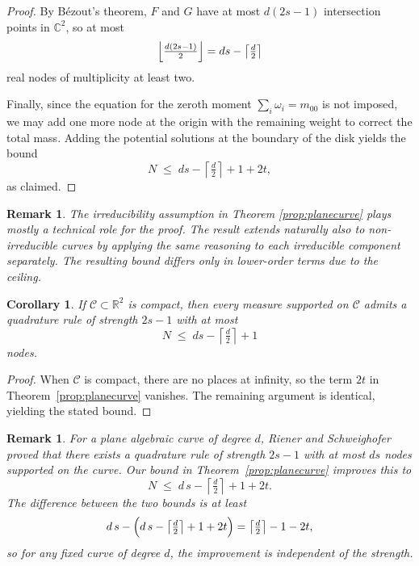 \documentclass[11pt,a4paper]{amsart}
\numberwithin{equation}{section}
\newtheorem{cor}[thm]{Corollary}
\newtheorem{remark}[thm]{Remark}
\theoremstyle{definition}
\newcommand{\R}{\mathbb{R}}
\newcommand{\C}{\mathbb{C}}
\numberwithin{thm}{section}
\theoremstyle{break}
\numberwithin{subcase}{case}
\begin{document}
\begin{proof}
By Bézout’s theorem, $F$ and $G$ have at most $d(2s-1)$ intersection points in $\C^2$, so at most  
\[
\Bigl\lfloor \tfrac{d(2s-1)}{2} \Bigr\rfloor = ds - \left\lceil \tfrac d2 \right\rceil
\]
real nodes of multiplicity at least two. 

Finally, since the equation for the zeroth moment $\sum_i \omega_i = m_{00}$ is not imposed, we may add one more node at the origin with the remaining weight to correct the total mass. Adding the potential solutions at the boundary of the disk yields the bound  
\[
N \;\le\; ds - \left\lceil \tfrac d2 \right\rceil + 1 + 2t,
\]
as claimed.
\end{proof}

\begin{remark}
    {The irreducibility assumption in Theorem \ref{prop:planecurve} plays mostly a technical role for the proof. The result extends naturally also to non-irreducible curves by applying the same reasoning to each irreducible component separately. The resulting bound differs only in lower-order terms due to the ceiling.}
\end{remark}



\begin{cor}
If $\mathcal C \subset \R^2$ is compact, then every measure supported on $\mathcal C$ admits a quadrature rule of strength $2s-1$ with at most  
\[
N \;\le\; ds - \left\lceil \tfrac d2 \right\rceil + 1
\]
nodes.
\end{cor}

\begin{proof}
When $\mathcal C$ is compact, there are no places at infinity, so the term $2t$ in Theorem~\ref{prop:planecurve} vanishes. The remaining argument is identical, yielding the stated bound.
\end{proof}


\begin{remark}
For a plane algebraic curve of degree $d$, Riener and Schweighofer~\cite{RS} proved that there exists a quadrature rule of strength $2s-1$ with at most $ds$ nodes supported on the curve. 
Our bound in Theorem~\ref{prop:planecurve} improves this to  
\[
N \;\le\; d\,s - \left\lceil \tfrac d2 \right\rceil + 1 + 2t.
\]
The difference between the two bounds is at least  
\[
d\,s - \Bigl(d\,s - \left\lceil \tfrac d2 \right\rceil + 1 + 2t\Bigr) 
= \left\lceil \tfrac d2 \right\rceil - 1 - 2t,
\]
so for any fixed curve of degree $d$, the improvement is independent of the strength.
\end{remark}
\end{document}
